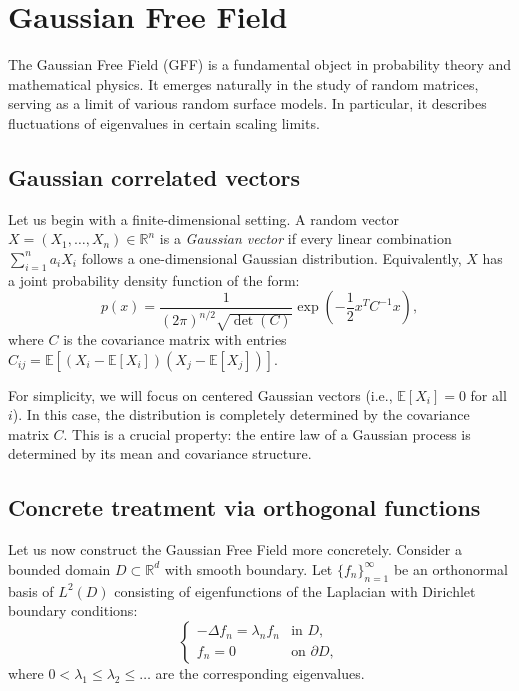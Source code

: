 \documentclass[letterpaper,11pt,oneside,reqno]{article}
\numberwithin{equation}{section}
\theoremstyle{definition}
\begin{document}
\section{Gaussian Free Field}

The Gaussian Free Field (GFF) is a fundamental object in probability theory and mathematical physics. It emerges naturally in the study of random matrices, serving as a limit of various random surface models. In particular, it describes fluctuations of eigenvalues in certain scaling limits.

\subsection{Gaussian correlated vectors}

Let us begin with a finite-dimensional setting. A random vector $X = (X_1, \ldots, X_n) \in \mathbb{R}^n$ is a \emph{Gaussian vector} if every linear combination $\sum_{i=1}^n a_i X_i$ follows a one-dimensional Gaussian distribution. Equivalently, $X$ has a joint probability density function of the form:
\begin{equation}
    p(x) = \frac{1}{(2\pi)^{n/2} \sqrt{\det(C)}} \exp\left(-\frac{1}{2} x^T C^{-1} x\right),
\end{equation}
where $C$ is the covariance matrix with entries $C_{ij} = \mathbb{E}[(X_i - \mathbb{E}[X_i])(X_j - \mathbb{E}[X_j])]$.

For simplicity, we will focus on centered Gaussian vectors (i.e., $\mathbb{E}[X_i] = 0$ for all $i$). In this case, the distribution is completely determined by the covariance matrix $C$. This is a crucial property: the entire law of a Gaussian process is determined by its mean and covariance structure.


\subsection{Concrete treatment via orthogonal functions}

Let us now construct the Gaussian Free Field more concretely. Consider a bounded domain $D \subset \mathbb{R}^d$ with smooth boundary. Let $\{f_n\}_{n=1}^{\infty}$ be an orthonormal basis of $L^2(D)$ consisting of eigenfunctions of the Laplacian with Dirichlet boundary conditions:
\begin{equation}
    \begin{cases}
        -\Delta f_n = \lambda_n f_n & \text{in } D, \\
        f_n = 0 & \text{on } \partial D,
    \end{cases}
\end{equation}
where $0 < \lambda_1 \leq \lambda_2 \leq \ldots$ are the corresponding eigenvalues.
\end{document}
